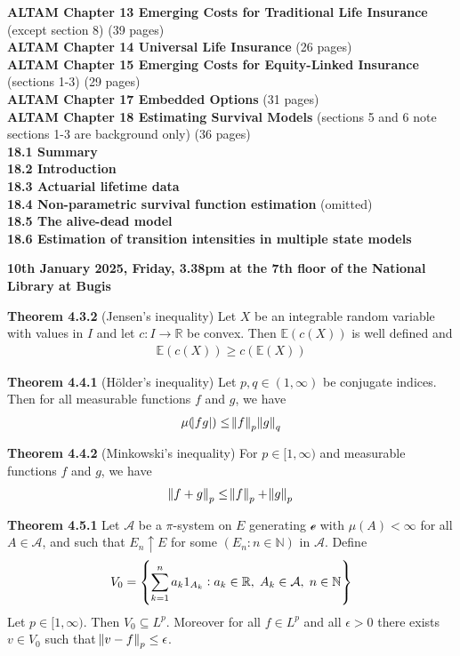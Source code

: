 \documentclass[hidelinks, 12pt]{article}
\theoremstyle{mydefstyle}
\theoremstyle{mythmstyle}
\begin{document}
\textbf{ALTAM Chapter 13 Emerging Costs for Traditional Life Insurance} (except section 8) (39 pages) \\

\textbf{ALTAM Chapter 14 Universal Life Insurance} (26 pages) \\

\textbf{ALTAM Chapter 15 Emerging Costs for Equity-Linked Insurance} (sections 1-3) (29 pages) \\

\textbf{ALTAM Chapter 17 Embedded Options} (31 pages) \\

\textbf{ALTAM Chapter 18 Estimating Survival Models} (sections 5 and 6 note sections 1-3 are background only) (36 pages) \\
\textbf{18.1 Summary} \\
\textbf{18.2 Introduction} \\
\textbf{18.3 Actuarial lifetime data} \\
\textbf{18.4 Non-parametric survival function estimation} (omitted) \\
\textbf{18.5 The alive-dead model} \\
\textbf{18.6 Estimation of transition intensities in multiple state models} 

\textbf{10th January 2025, Friday, 3.38pm at the 7th floor of the National Library at Bugis}

\textbf{Theorem 4.3.2} (Jensen's inequality) Let $X$ be an integrable random variable with values in $I$ and let $c : I \to \mathbb{R}$ be convex. Then $\mathbb{E}(c(X))$ is well defined and
\begin{gather*}
\mathbb{E}(c(X)) \ge c(\mathbb{E}(X))
\end{gather*}

\textbf{Theorem 4.4.1} (H{\"o}lder's inequality) Let $p, q \in (1, \infty)$ be conjugate indices. Then for all measurable functions $f$ and $g$, we have
\begin{gather*}
\mu(\abs{fg}) \le \norm{f}_p \norm{g}_q
\end{gather*}

\textbf{Theorem 4.4.2} (Minkowski's inequality) For $p \in [1, \infty)$ and measurable functions $f$ and $g$, we have
\begin{gather*}
\norm{f + g}_p \le \norm{f}_p + \norm{g}_p
\end{gather*}

\textbf{Theorem 4.5.1} Let $\mathcal{A}$ be a $\pi$-system on $E$ generating $\mathcal{e}$ with $\mu(A) < \infty$ for all $A \in \mathcal{A}$, and such that $E_n \uparrow E$ for some $(E_n : n \in \mathbb{N})$ in $\mathcal{A}$. Define
\begin{gather*}
V_0 = \left\{ \sum_{k = 1}^n a_k 1_{A_k} : a_k \in \mathbb{R}, \hspace{1mm} A_k \in \mathcal{A}, \hspace{1mm} n \in \mathbb{N} \right\}
\end{gather*}
Let $p \in [1, \infty)$. Then $V_0 \subseteq L^p$. Moreover for all $f \in L^p$ and all $\epsilon > 0$ there exists $v \in V_0$ such that $\norm{v - f}_p \le \epsilon$. 
\end{document}
